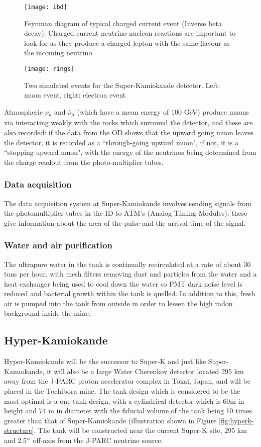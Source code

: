 \documentclass[11pt,oneside,a4paper]{article}
\begin{document}
\begin{figure}[htbp]
	\centering
	\texttt{[image: ibd]}
	\caption{Feynman diagram of typical charged current event (Inverse beta decay). Charged current neutrino-nucleon reactions are important to look for as they produce a charged lepton with the same flavour as the incoming neutrino}
	\label{fig:CCinteraction}
\end{figure}

\begin{figure}[htbp]
	\centering
	\texttt{[image: rings]}
	\caption{Two simulated events for the Super-Kamiokande detector. Left: muon event, right: electron event}
	\label{fig:rings}
\end{figure}

Atmospheric $\nu_{\mu}$ and $\bar{\nu}_{\mu}$ (which have a mean energy of 100 GeV) produce muons via interacting weakly with the rocks which surround the detector, and these are also recorded: if the data from the OD shows that the upward going muon leaves the detector, it is recorded as a ``through-going upward muon", if not, it is a ``stopping upward muon", with the energy of the neutrinos being determined from the charge readout from the photo-multiplier tubes.

\subsubsection{Data acquisition}
The data acquisition system at Super-Kamiokande involves sending signals from the photomultiplier tubes in the ID to ATM's (Analog Timing Modules); these give information about the area of the pulse and the arrival time of the signal.

\subsubsection{Water and air purification}
The ultrapure water in the tank is continually recirculated at a rate of about 30 tons per hour, with mesh filters removing dust and particles from the water and a heat exchanger being used to cool down the water so PMT dark noise level is reduced and bacterial growth within the tank is quelled. In addition to this, fresh air is pumped into the tank from outside in order to lessen the high radon background inside the mine. 

\subsection{Hyper-Kamiokande}
Hyper-Kamiokande will be the successor to Super-K and just like Super-Kamiokande, it will also be a large Water Cherenkov detector located 295 km away from the J-PARC proton accelerator complex in Tokai, Japan, and will be placed in the Tochibora mine. The tank design which is considered to be the most optimal is a one-tank design, with a cylindrical detector which is 60m in height and 74 m in diameter with the fiducial volume of the tank being 10 times greater than that of Super-Kamiokande (illustration shown in Figure \ref{fig:hyperk-structure}. The tank will be constructed near the current Super-K site, 295 km and 2.5$\degree$ off-axis from the J-PARC neutrino source.
\end{document}
